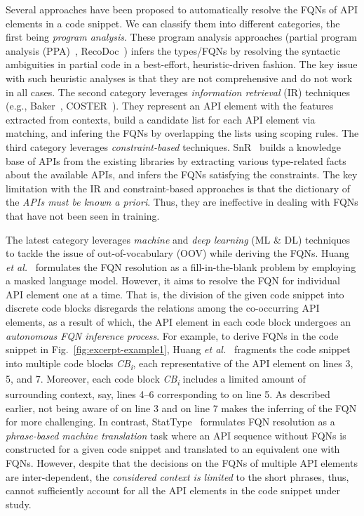 Several approaches have been proposed to automatically resolve the FQNs of API elements in a code snippet. We can classify them into different categories, the first being {\em program analysis}. These program analysis approaches (partial program analysis (PPA)~\cite{dagenais-oopsla08}, RecoDoc~\cite{dagenais-icse12}) infers the types/FQNs by resolving the syntactic ambiguities in partial code in a best-effort, heuristic-driven fashion. The key issue with such heuristic analyses is that they are not comprehensive and do not work in all cases. The second category leverages {\em information retrieval} (IR) techniques (e.g., Baker~\cite{liveapi14}, COSTER~\cite{coster-ase19}). They represent an API element with the features extracted from contexts, build a candidate list for each API element via matching, and infering the FQNs by overlapping the lists using scoping rules. The third category leverages {\em constraint-based} techniques. SnR~\cite{snr-icse22} builds a knowledge base of APIs from the existing libraries by extracting various type-related facts about the available APIs, and infers the FQNs satisfying the constraints. The key limitation with the IR and constraint-based approaches is that the dictionary of the \emph{APIs must be known a priori}. Thus, they are ineffective in dealing with FQNs that have not been seen in training.

The latest category leverages {\em machine} and {\em deep learning}
(ML \& DL) techniques to tackle the issue of out-of-vocabulary (OOV)
while deriving the FQNs. Huang {\em et al.}~\cite{prompt-ase22}
formulates the FQN resolution as a fill-in-the-blank problem by
employing a masked language model.
However, it aims to resolve the FQN for individual API element one at
a time. That is, the division of the given code snippet into discrete
code blocks disregards the relations among the co-occurring API
elements, as a result of which, the API element in each code block
undergoes an {\em autonomous FQN inference process}. For example, to
derive FQNs in the code snippet in Fig.~\ref{fig:excerpt-example1},
Huang {\em et al.}~\cite{prompt-ase22} fragments the code snippet into
multiple code blocks \textit{CB\textsubscript{i}}, each representative
of the API element on lines 3, 5, and 7. Moreover, each code block
\textit{CB\textsubscript{i}} includes a limited amount of surrounding
context, say, lines 4--6 corresponding to  on line 5. As
described earlier, not being aware of  on line 3 and
 on line 7 makes the inferring of the FQN for
 more challenging. In contrast, StatType~\cite{icse18}
formulates FQN resolution as a {\em phrase-based machine translation}
task where an API sequence without FQNs is constructed for a given
code snippet and translated to an equivalent one with FQNs. However,
despite that the decisions on the FQNs of multiple API elements are
inter-dependent, the {\em considered context is limited} to the short
phrases, thus, cannot sufficiently account for all the API elements
in the code snippet under study.

